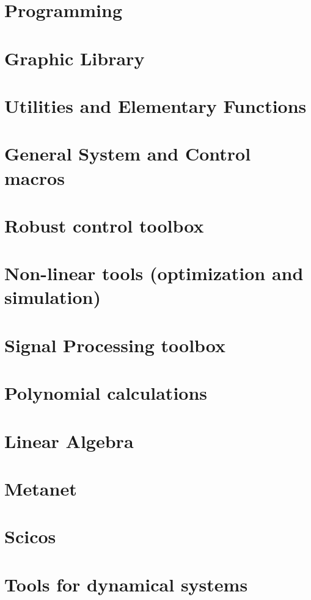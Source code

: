              \textheight=660pt 
             \textwidth=15cm
             \topmargin=-27pt 
             \oddsidemargin=0.7cm
             \evensidemargin=0.7cm
             \marginparwidth=60pt
\def\vector#1{\left( \begin{array}{c} #1  \end{array}\right)}
\def\matrixq#1{\left( \begin{array}{cc} #1  \end{array}\right)}

\makeindex 

%





\chapter{Programming}
	 
\chapter{Graphic Library }
	 
\chapter{Utilities and Elementary Functions}
	 
\chapter{General System and Control macros}
	 
\chapter{Robust control toolbox}
	 
\chapter{Non-linear tools (optimization and simulation) }
	 
\chapter{Signal Processing toolbox}
	 
	
\chapter{Polynomial calculations}
	
\chapter{Linear Algebra}
	
\chapter{Metanet}
	
\chapter{Scicos} 
	
\chapter{Tools for dynamical systems}
	


\printindex

